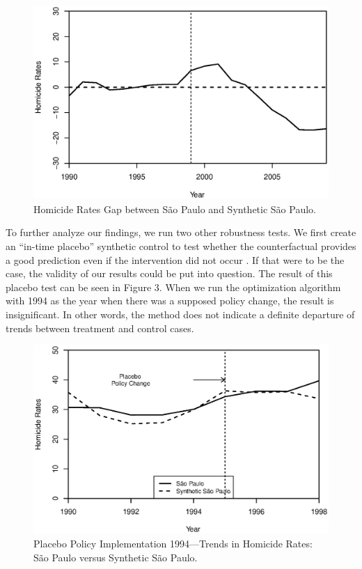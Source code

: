 \documentclass[a4paper,11pt]{article}
\begin{document}
\begin{figure}[htp!]
\begin{center}
\centerline{\includegraphics[width=.6\textwidth]{gaps.eps}}
\caption{Homicide Rates Gap between S\~{a}o Paulo and Synthetic S\~{a}o Paulo.}\label{gaps}
\end{center}
\end{figure}

To further analyze our findings, we run two other robustness tests. We first create an ``in-time placebo'' synthetic control to test whether the counterfactual provides a good prediction even if the intervention did not occur \citep{abadie2014}. If that were to be the case, the validity of our results could be put into question. The result of this placebo test can be seen in Figure 3. When we run the optimization algorithm with 1994 as the year when there was a supposed policy change, the result is insignificant. In other words, the method does not indicate a definite departure of trends between treatment and control cases. 

\begin{figure}[htp!]
\begin{center}
\centerline{\includegraphics[width=.6\textwidth]{placebo.eps}}
\caption{Placebo Policy Implementation 1994---Trends in Homicide Rates: S\~{a}o Paulo versus Synthetic S\~{a}o Paulo.}\label{placebo}
\end{center}
\end{figure}

\newpage
\end{document}
